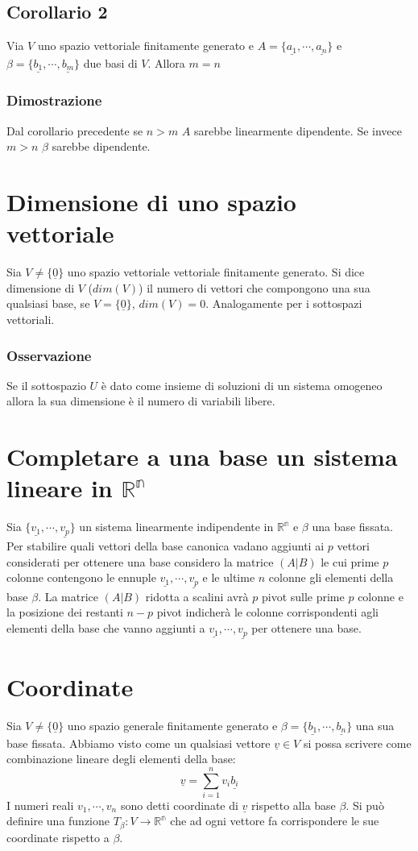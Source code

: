 \subsection{Corollario 2}
Via $V$ uno spazio vettoriale finitamente generato e $A=\{\underline{a_1},\cdots,\underline{a_n}\}$ e $\beta=\{\underline{b_1},\cdots,\underline{b_m}\}$ due basi di $V$. Allora 
$m=n$
\subsubsection{Dimostrazione}
Dal corollario precedente se $n>m$ $A$ sarebbe linearmente dipendente. Se invece $m>n$ $\beta$ sarebbe dipendente.
\section{Dimensione di uno spazio vettoriale}
Sia $V\neq \{\underline{0}\}$ uno spazio vettoriale vettoriale finitamente generato. Si dice dimensione di $V$ ($dim(V)$) il numero di vettori che compongono una sua qualsiasi 
base, se $V=\{\underline{0}\}$, $dim(V)=0$. Analogamente per i sottospazi vettoriali.
\subsubsection{Osservazione}
Se il sottospazio $U$ \`e dato come insieme di soluzioni di un sistema omogeneo allora la sua dimensione \`e il numero di variabili libere.
\section{Completare a una base un sistema lineare in $\mathbb{R^n}$}
Sia $\{\underline{v_1},\cdots,\underline{v_p}\}$ un sistema linearmente indipendente in $\mathbb{R^n}$ e $\beta$ una base fissata. Per stabilire quali vettori della base canonica
vadano aggiunti ai $p$ vettori considerati per ottenere una base considero la matrice $(A|B)$ le cui prime $p$ colonne contengono le ennuple $\underline{v_1},\cdots,
\underline{v_p}$ e le ultime $n$ colonne gli elementi della base $\beta$. La matrice $(A|B)$ ridotta a scalini avr\`a  $p$ pivot sulle prime $p$ colonne e la posizione dei 
restanti $n-p$ pivot indicher\`a le colonne corrispondenti agli elementi della base che vanno aggiunti a $\underline{v_1},\cdots,\underline{v_p}$ per ottenere una base.
\section{Coordinate}
Sia $V\neq \{\underline{0}\}$ uno spazio generale finitamente generato e $\beta=\{\underline{b_1},\cdots,\underline{b_n}\}$ una sua base fissata. Abbiamo visto come un qualsiasi 
vettore $\underline{v}\in V$ si possa scrivere come combinazione lineare degli elementi della base:
\begin{equation}
\underline{v}=\sum\limits_{i=1}^n v_i\underline{b_i} 
\end{equation}
I numeri reali $v_1,\cdots, v_n$ sono detti coordinate di $\underline{v}$ rispetto alla base $\beta$. Si pu\`o definire una funzione $T_\beta:V\rightarrow\mathbb{R^n}$ che ad 
ogni vettore fa corrispondere le sue coordinate rispetto a $\beta$. 
